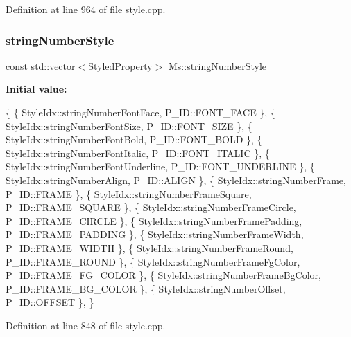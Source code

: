 Definition at line 964 of file style.\+cpp.

\mbox{\label{namespace_ms_a96915661c082f533c2e6dfba85f46e7e}} 
\subsubsection{\texorpdfstring{string\+Number\+Style}{stringNumberStyle}}
{\footnotesize\ttfamily const std\+::vector$<$\hyperlink{struct_ms_1_1_styled_property}{Styled\+Property}$>$ Ms\+::string\+Number\+Style}

{\bfseries Initial value\+:}
\begin{DoxyCode}
\{
      \{ StyleIdx::stringNumberFontFace,               P\_ID::FONT\_FACE              \},
      \{ StyleIdx::stringNumberFontSize,               P\_ID::FONT\_SIZE              \},
      \{ StyleIdx::stringNumberFontBold,               P\_ID::FONT\_BOLD              \},
      \{ StyleIdx::stringNumberFontItalic,             P\_ID::FONT\_ITALIC            \},
      \{ StyleIdx::stringNumberFontUnderline,          P\_ID::FONT\_UNDERLINE         \},
      \{ StyleIdx::stringNumberAlign,                  P\_ID::ALIGN                  \},
      \{ StyleIdx::stringNumberFrame,                  P\_ID::FRAME                  \},
      \{ StyleIdx::stringNumberFrameSquare,            P\_ID::FRAME\_SQUARE           \},
      \{ StyleIdx::stringNumberFrameCircle,            P\_ID::FRAME\_CIRCLE           \},
      \{ StyleIdx::stringNumberFramePadding,           P\_ID::FRAME\_PADDING          \},
      \{ StyleIdx::stringNumberFrameWidth,             P\_ID::FRAME\_WIDTH            \},
      \{ StyleIdx::stringNumberFrameRound,             P\_ID::FRAME\_ROUND            \},
      \{ StyleIdx::stringNumberFrameFgColor,           P\_ID::FRAME\_FG\_COLOR         \},
      \{ StyleIdx::stringNumberFrameBgColor,           P\_ID::FRAME\_BG\_COLOR         \},
      \{ StyleIdx::stringNumberOffset,                 P\_ID::OFFSET                 \},
      \}
\end{DoxyCode}


Definition at line 848 of file style.\+cpp.

\mbox{\label{namespace_ms_a763a6adfb0854ecead4398c25a8fdb53}} 

